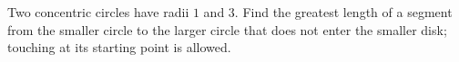 Two concentric circles have radii $1$ and $3$. Find the greatest length of a segment from the smaller circle to the larger circle that does not enter the smaller disk; touching at its starting point is allowed.
